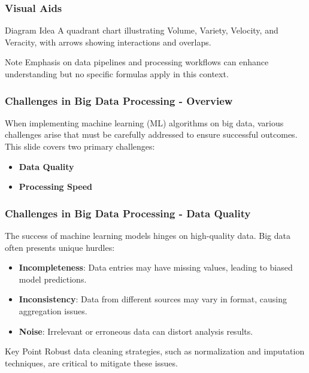 \documentclass[aspectratio=169]{beamer}
\begin{document}
\begin{frame}[fragile]
    \frametitle{Visual Aids}
    \begin{block}{Diagram Idea}
        A quadrant chart illustrating Volume, Variety, Velocity, and Veracity, with arrows showing interactions and overlaps.
    \end{block}
    \begin{block}{Note}
        Emphasis on data pipelines and processing workflows can enhance understanding but no specific formulas apply in this context.
    \end{block}
\end{frame}

\begin{frame}[fragile]
    \frametitle{Challenges in Big Data Processing - Overview}
    When implementing machine learning (ML) algorithms on big data, various challenges arise that must be carefully addressed to ensure successful outcomes. This slide covers two primary challenges:
    \begin{itemize}
        \item \textbf{Data Quality}
        \item \textbf{Processing Speed}
    \end{itemize}
\end{frame}

\begin{frame}[fragile]
    \frametitle{Challenges in Big Data Processing - Data Quality}
    The success of machine learning models hinges on high-quality data. Big data often presents unique hurdles:

    \begin{itemize}
        \item \textbf{Incompleteness}: Data entries may have missing values, leading to biased model predictions. 
        \item \textbf{Inconsistency}: Data from different sources may vary in format, causing aggregation issues.
        \item \textbf{Noise}: Irrelevant or erroneous data can distort analysis results.
    \end{itemize}

    \begin{block}{Key Point}
        Robust data cleaning strategies, such as normalization and imputation techniques, are critical to mitigate these issues.
    \end{block}
\end{frame}
\end{document}
